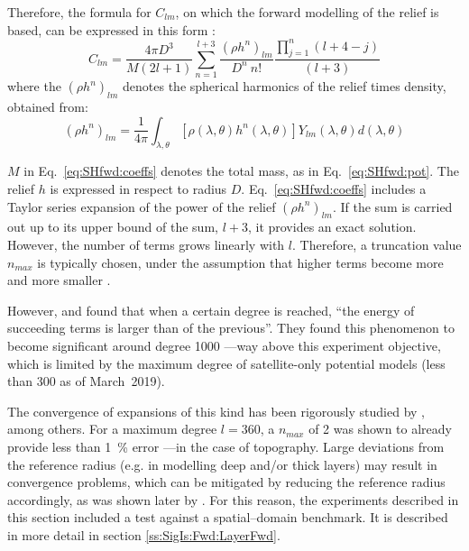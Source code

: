 Therefore, the formula for $C_{lm}$, on which the forward modelling of the relief is based, can be expressed in this form \parencite{Wieczorek2007}:
\begin{equation}
    \label{eq:SHfwd:coeffs}
    C_{lm} =
    \frac{4 \pi D^3}{M(2l+1)}
    \sum_{n=1}^{l+3}
    \frac{(\rho h^n)_{lm}}{D^n \ n!}
    \frac{\prod_{j=1}^{n}(l+4-j)}{(l+3)}
\end{equation}
where the $(\rho h^n)_{lm}$ denotes the spherical harmonics of the relief times density, obtained from:
\begin{equation}
    \label{eq:SHfwd:reliefSH}
    (\rho h^n)_{lm} =
    \frac{1}{4 \pi}
    \int_{\lambda, \theta}
    \left[ \rho(\lambda, \theta) h^n(\lambda, \theta) \right]
    Y_{lm}(\lambda, \theta) d(\lambda, \theta)
\end{equation}

$M$ in Eq.~\ref{eq:SHfwd:coeffs} denotes the total mass, as in Eq.~\ref{eq:SHfwd:pot}.
The relief $h$ is expressed in respect to radius $D$.
Eq.~\ref{eq:SHfwd:coeffs} includes a Taylor series expansion of the power of the relief $(\rho h^n)_{lm}$.
If the sum is carried out up to its upper bound of the sum, $l+3$, it provides an exact solution.
However, the number of terms grows linearly with $l$.
Therefore, a truncation value $n_{max}$ is typically chosen, under the assumption that higher terms become more and more smaller \parencite{Wieczorek2007}.

However, \textcite{Balmino2012} and \textcite{Hirt2017} found that when a certain degree is reached, ``the energy of succeeding terms is larger than of the previous''.
They found this phenomenon to become significant around degree \num{1000} ---way above this experiment objective, which is limited by the maximum degree of satellite-only potential models (less than \num{300} as of March~2019).

The convergence of expansions of this kind has been rigorously studied by \textcite{Sun2001}, among others.
For a maximum degree $l = \num{360}$, a $n_{max}$ of \num{2} was shown to already provide less than \SI{1}{\percent} error ---in the case of topography.
Large deviations from the reference radius (e.g. in modelling deep and/or thick layers) may result in convergence problems, which can be mitigated by reducing the reference radius accordingly, as was shown later by \textcite{Root2015}.
For this reason, the experiments described in this section included a test against a spatial--domain benchmark.
It is described in more detail in section \ref{ss:SigIs:Fwd:LayerFwd}.

